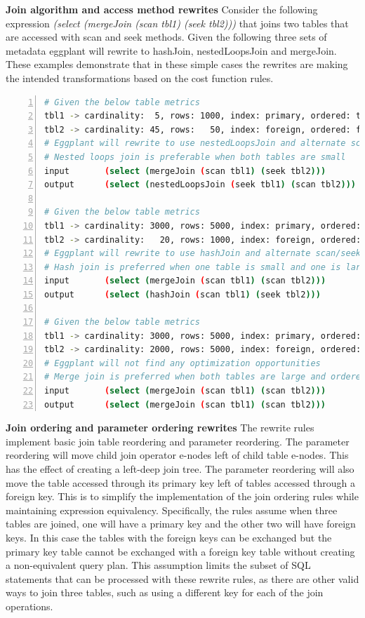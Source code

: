 \documentclass{article}
\begin{document}
\textbf{Join algorithm and access method rewrites} Consider the following expression \textit{(select (mergeJoin (scan tbl1) (seek tbl2)))}
that joins two tables that are accessed with scan and seek methods.  Given the following three sets of metadata eggplant
will rewrite to hashJoin, nestedLoopsJoin and mergeJoin.  These examples demonstrate that in these simple cases the
rewrites are making the intended transformations based on the cost function rules.

\begin{lstlisting}[language=bash,
    frame=single, numbers=left, numbersep=5pt, numberstyle=\tiny\color{mygray},stringstyle=\ttfamily]
# Given the below table metrics
tbl1 -> cardinality:  5, rows: 1000, index: primary, ordered: true
tbl2 -> cardinality: 45, rows:   50, index: foreign, ordered: false
# Eggplant will rewrite to use nestedLoopsJoin and alternate scan/seek access methods
# Nested loops join is preferable when both tables are small
input       (select (mergeJoin (scan tbl1) (seek tbl2)))
output      (select (nestedLoopsJoin (seek tbl1) (scan tbl2)))

# Given the below table metrics
tbl1 -> cardinality: 3000, rows: 5000, index: primary, ordered: true
tbl2 -> cardinality:   20, rows: 1000, index: foreign, ordered: false
# Eggplant will rewrite to use hashJoin and alternate scan/seek access methods
# Hash join is preferred when one table is small and one is large
input       (select (mergeJoin (scan tbl1) (scan tbl2)))
output      (select (hashJoin (scan tbl1) (seek tbl2)))

# Given the below table metrics
tbl1 -> cardinality: 3000, rows: 5000, index: primary, ordered: true
tbl2 -> cardinality: 2000, rows: 5000, index: foreign, ordered: true
# Eggplant will not find any optimization opportunities
# Merge join is preferred when both tables are large and ordered
input       (select (mergeJoin (scan tbl1) (scan tbl2)))
output      (select (mergeJoin (scan tbl1) (scan tbl2)))
\end{lstlisting}

\textbf{Join ordering and parameter ordering rewrites} The rewrite rules implement basic
join table reordering and parameter reordering.  The parameter reordering will
move child join operator e-nodes left of child table e-nodes.  This has the effect of creating a left-deep
join tree.  The parameter reordering will also move the table accessed through its primary key
left of tables accessed through a foreign key.  This is to simplify the implementation of the 
join ordering rules while maintaining expression equivalency.  Specifically, the rules assume
when three tables are joined, one will have a primary key and the other two will have foreign keys.
In this case the tables with the foreign keys can be exchanged but the primary key table cannot 
be exchanged with a foreign key table without creating a non-equivalent query plan.  This assumption
limits the subset of SQL statements that can be processed with these rewrite rules, as there are
other valid ways to join three tables, such as using a different key for each of the join operations.
\end{document}
